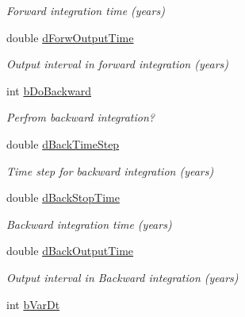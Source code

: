 \begin{DoxyCompactItemize}
\begin{DoxyCompactList}\small\item\em Forward integration time (years) \end{DoxyCompactList}\item 
\hypertarget{struct_p_a_r_a_m_ae696b0638418149d091b6ea0417ecdf0}{}double \hyperlink{struct_p_a_r_a_m_ae696b0638418149d091b6ea0417ecdf0}{d\+Forw\+Output\+Time}\label{struct_p_a_r_a_m_ae696b0638418149d091b6ea0417ecdf0}

\begin{DoxyCompactList}\small\item\em Output interval in forward integration (years) \end{DoxyCompactList}\item 
\hypertarget{struct_p_a_r_a_m_aa535e539a1c33cfa46691e7fd00006e2}{}int \hyperlink{struct_p_a_r_a_m_aa535e539a1c33cfa46691e7fd00006e2}{b\+Do\+Backward}\label{struct_p_a_r_a_m_aa535e539a1c33cfa46691e7fd00006e2}

\begin{DoxyCompactList}\small\item\em Perfrom backward integration? \end{DoxyCompactList}\item 
\hypertarget{struct_p_a_r_a_m_a4aa910e2d740ff5069d35db83d9d0166}{}double \hyperlink{struct_p_a_r_a_m_a4aa910e2d740ff5069d35db83d9d0166}{d\+Back\+Time\+Step}\label{struct_p_a_r_a_m_a4aa910e2d740ff5069d35db83d9d0166}

\begin{DoxyCompactList}\small\item\em Time step for backward integration (years) \end{DoxyCompactList}\item 
\hypertarget{struct_p_a_r_a_m_ab531c23d2042398077c3c8ae7548d310}{}double \hyperlink{struct_p_a_r_a_m_ab531c23d2042398077c3c8ae7548d310}{d\+Back\+Stop\+Time}\label{struct_p_a_r_a_m_ab531c23d2042398077c3c8ae7548d310}

\begin{DoxyCompactList}\small\item\em Backward integration time (years) \end{DoxyCompactList}\item 
\hypertarget{struct_p_a_r_a_m_a59e85623e7c228475bb6583a01ff1106}{}double \hyperlink{struct_p_a_r_a_m_a59e85623e7c228475bb6583a01ff1106}{d\+Back\+Output\+Time}\label{struct_p_a_r_a_m_a59e85623e7c228475bb6583a01ff1106}

\begin{DoxyCompactList}\small\item\em Output interval in Backward integration (years) \end{DoxyCompactList}\item 
\hypertarget{struct_p_a_r_a_m_a1dbed7782748f6bc2ec750152677c19f}{}int \hyperlink{struct_p_a_r_a_m_a1dbed7782748f6bc2ec750152677c19f}{b\+Var\+Dt}\label{struct_p_a_r_a_m_a1dbed7782748f6bc2ec750152677c19f}


\end{DoxyCompactItemize}
